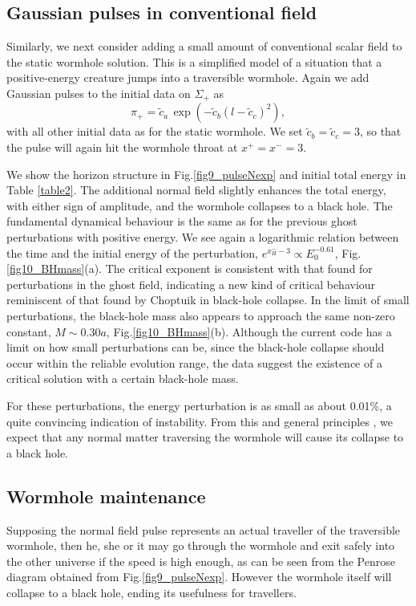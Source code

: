 \documentclass[aps,showpacs,twocolumn,draft,eqsecnum]{revtex4}
\begin{document}
\subsection{Gaussian pulses in conventional field}
Similarly, we next consider adding a small amount of conventional scalar field
to the static wormhole solution. This is a simplified model of a situation that
a positive-energy creature jumps into a traversible wormhole. Again we add
Gaussian pulses to the initial data on $\Sigma_+$ as
\begin{equation}
\pi_+=  \tilde{c}_a \, \exp (-\tilde{c}_b(l-\tilde{c}_c)^2), \label{pulseeq2}
\end{equation}
with all other initial data as for the static wormhole. We set
$\tilde{c}_b=\tilde{c}_c=3$, so that the pulse will again hit the wormhole
throat at $x^+=x^-=3$.

We show the horizon structure in Fig.\ref{fig9_pulseNexp} and initial total
energy in Table \ref{table2}. The additional normal field slightly enhances the
total energy, with either sign of amplitude, and the wormhole collapses to a
black hole. The fundamental dynamical behaviour is the same as for the previous
ghost perturbations with positive energy. We see again a logarithmic relation
between the time and the initial energy of the perturbation, $e^{x^-_H-3} \propto
E_0^{-0.61}$, Fig.\ref{fig10_BHmass}(a). The critical exponent is consistent
with that found for perturbations in the ghost field, indicating a new kind of
critical behaviour reminiscent of that found by Choptuik \cite{Ch} in
black-hole collapse. In the limit of small perturbations, the black-hole mass
also appears to approach the same non-zero constant, $M\sim 0.30a$,
Fig.\ref{fig10_BHmass}(b). Although the current code has a limit on how small
perturbations can be, since the black-hole collapse should occur within the
reliable evolution range, the data suggest the existence of a critical solution
with a certain black-hole mass.

For these perturbations, the energy perturbation is as small as about 0.01\%, a
quite convincing indication of instability. From this and general principles
\cite{wh}, we expect that any normal matter traversing the wormhole will cause
its collapse to a black hole.

\subsection{Wormhole maintenance}
Supposing the normal field pulse represents an actual traveller of the
traversible wormhole, then he, she or it may go through the wormhole and exit
safely into the other universe if the speed is high enough, as can be seen from
the Penrose diagram obtained from Fig.\ref{fig9_pulseNexp}. However the
wormhole itself will collapse to a black hole, ending its usefulness for
travellers.
\end{document}
